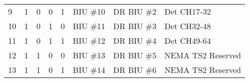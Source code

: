 \documentclass[]{article}
\begin{document}
\begin{table}[ht]
\begin{tabular}{llllllll}
			\rowcolor[HTML]{EFEFEF} 
			9            & 1              & 0              & 0              & 1              & BIU \#10                             & DR BIU \#2                           & \cellcolor[HTML]{EFEFEF}Det CH17-32                                                                                                                                                                                                                                                                                                                                              \\
			\rowcolor[HTML]{EFEFEF} 
			10           & 1              & 0              & 1              & 0              & BIU \#11                             & DR BIU \#3                           & \cellcolor[HTML]{EFEFEF}Det CH32-48                                                                                                                                                                                                                                                                                                                                              \\
			\rowcolor[HTML]{EFEFEF} 
			11           & 1              & 0              & 1              & 1              & BIU \#12                             & DR BIU \#4                           & \cellcolor[HTML]{EFEFEF}Det CH49-64                                                                                                                                                                                                                                                                                                                                              \\
			12           & 1              & 1              & 0              & 0              & BIU \#13                             & DR BIU \#5                           & NEMA TS2 Reserved                                                                                                                                                                                                                                                                                                                                                                         \\
			13           & 1              & 1              & 0              & 1              & BIU \#14                             & DR BIU \#6                           & NEMA TS2 Reserved                                                                                                                                                                                                                                                                                                                                                                         \\

\end{tabular}
\end{table}
\end{document}
